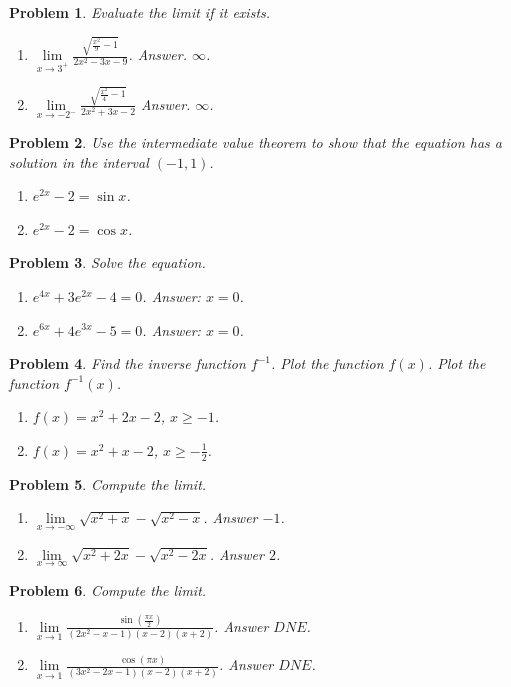 \documentclass{article}
\newtheorem{problem}{Problem}
\begin{document}
\begin{problem}
Evaluate the limit if it exists.
\begin{enumerate}
\item $\lim\limits_{x\to 3^+} \frac{\sqrt{\frac{x^2}{9}-1 }}{2x^2 -3x-9 }$. Answer. $ \infty$.
\item $\lim\limits_{x\to -2^-} \frac{\sqrt{\frac{x^2}{4}-1 }}{2x^2 +3x-2 }$ Answer. $ \infty$.
\end{enumerate}
\end{problem}
\begin{problem}
Use the intermediate value theorem to show that the equation has a solution in the interval $(-1,1)$.
\begin{enumerate}
\item $e^{2x}-2=\sin  x$.
\item $e^{2x}-2=\cos  x$.
\end{enumerate}
\end{problem}
\begin{problem}
Solve the equation.
\begin{enumerate}
\item $e^{4x}+3e^{2x}-4=0$. Answer: $x=0$.
\item $e^{6x}+4e^{3x}-5=0$. Answer: $x=0$.
\end{enumerate}
\end{problem}
\begin{problem}
Find the inverse function $f^{-1}$. Plot the function $f(x)$. Plot the function $f^{-1}(x)$.
\begin{enumerate}
\item $f(x)= x^2+2x-2$, $ x\geq -1$.
\item $f(x)= x^2+x-2$, $ x\geq -\frac{1}{2}$.
\end{enumerate}
\end{problem}
\begin{problem}
Compute the limit.
\begin{enumerate}
\item $\lim\limits_{x\to-\infty}\sqrt{x^2+x}-\sqrt{x^2-x}$. Answer $-1 $.
\item $\lim\limits_{x\to\infty}\sqrt{x^2+2x}-\sqrt{x^2-2x} $. Answer $2 $.
\end{enumerate}
\end{problem}
\begin{problem}
Compute the limit.
\begin{enumerate}
\item $\lim\limits_{x\to 1}\frac{\sin( \frac{\pi x}{2}) }{(2x^{2}-x-1)(x-2)(x+2)}$. Answer $DNE$.
\item $\lim\limits_{x\to 1}\frac{\cos(\pi x) }{(3x^{2}-2x-1)(x-2)(x+2)}$. Answer $DNE$.
\end{enumerate}
\end{problem}
\end{document}
